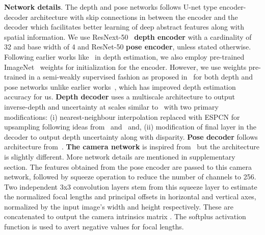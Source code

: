\documentclass{bmvc2k}
\begin{document}
\textbf{Network details}. The depth and pose networks follows U-net type encoder-decoder architecture with skip connections in between the encoder and the decoder which facilitates better learning of deep abstract features along with spatial information. We use ResNext-50~\cite{xie2017aggregated} \textbf{depth encoder} with a cardinality of 32 and base width of 4 and ResNet-50 \textbf{pose encoder}, unless stated otherwise. Following earlier works like~\cite{guo2018learning,godard2019digging, kuznietsov2017semi, johnston2020self} in depth estimation, we also employ pre-trained ImageNet~\cite{russakovsky2015imagenet} weights for initialization for the encoder. However, we use weights pre-trained in a semi-weakly supervised fashion as proposed in~\cite{yalniz2019billion} for both depth and pose networks unlike earlier works~\cite{godard2017unsupervised,godard2019digging,guizilini20203d}, which has improved depth estimation accuracy for us. \textbf{Depth decoder} uses a multiscale architecture to output inverse-depth and uncertainty at  scales similar to~\cite{godard2019digging} with two primary modifications: (i) nearest-neighbour interpolation replaced with ESPCN for upsampling following ideas from~\cite{shi2016real} and~\cite{aitken2017checkerboard} and, (ii) modification of final layer in the decoder to output depth uncertainty along with disparity. \textbf{Pose decoder} follows architecture from~\cite{godard2019digging}. \textbf{The camera network} is inspired from~\cite{gordon2019depth} but the architecture is slightly different. More network details are mentioned in supplementary section. The features obtained from the pose encoder are passed to this camera network, followed by squeeze operation to reduce the number of channels to 256. Two independent 3x3 convolution layers stem from this squeeze layer to estimate the normalized focal lengths  and principal offsets  in horizontal and vertical axes, normalized by the input image's width and height respectively. These are concatenated to output the camera intrinsics matrix . The softplus activation function  is used to avert negative values for focal lengths. 
\end{document}
